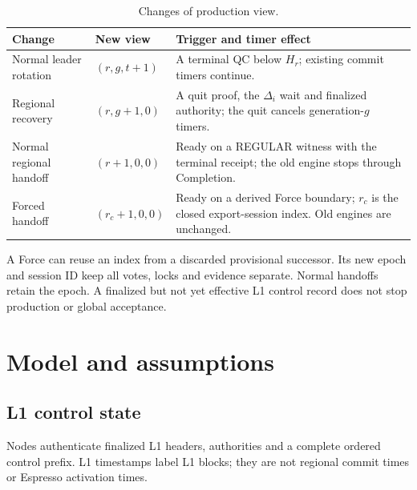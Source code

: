 \documentclass[11pt,a4paper]{article}
\begin{document}
\begin{table}[htbp]\centering\small
\caption{Changes of production view.}\label{tab:views}
\begin{tabularx}{\linewidth}{@{}>{\raggedright\arraybackslash}p{.19\linewidth}>{\raggedright\arraybackslash}p{.18\linewidth}Y@{}}\toprule
Change & New view & Trigger and timer effect\\\midrule
Normal leader rotation & $(r,g,t+1)$ & A terminal QC below $H_r$;
existing commit timers continue.\\
Regional recovery & $(r,g+1,0)$ & A quit proof, the $\Delta_i$ wait
and finalized authority; the quit cancels generation-$g$ timers.\\
Normal regional handoff & $(r+1,0,0)$ & Ready on a REGULAR witness
with the terminal receipt; the old engine stops through Completion.\\
Forced handoff & $(r_c+1,0,0)$ & Ready on a derived Force boundary;
$r_c$ is the closed export-session index. Old engines are unchanged.\\
\bottomrule\end{tabularx}
\end{table}

A Force can reuse an index from a discarded provisional successor.
Its new epoch and session ID keep all votes, locks and evidence separate.
Normal handoffs retain the epoch. A finalized but not yet effective L1
control record does not stop production or global acceptance.

\section{Model and assumptions}
\label{sec:model}
\subsection{L1 control state}
\label{sec:l1}
Nodes authenticate finalized L1 headers, authorities and a complete
ordered control prefix. L1 timestamps label L1 blocks; they are not
regional commit times or Espresso activation times.
\end{document}
